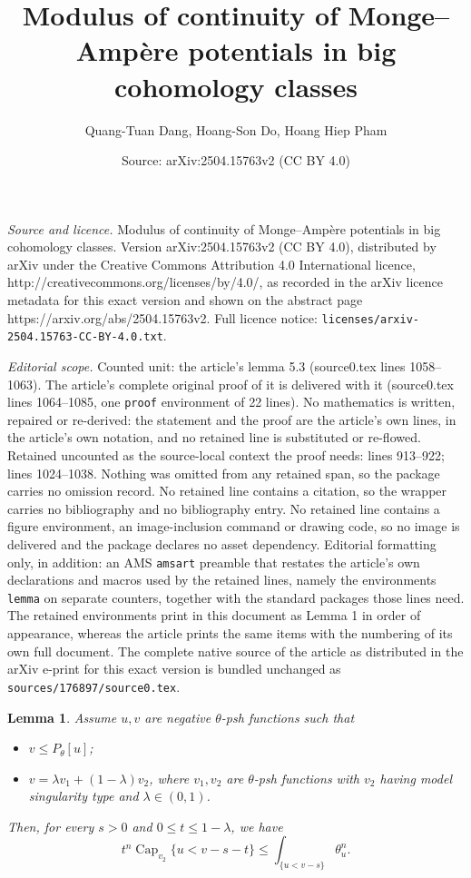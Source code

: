 \documentclass[10pt,a4paper]{amsart}
\title{Modulus of continuity of Monge--Amp\`ere potentials in big cohomology classes}
\author{Quang-Tuan Dang, Hoang-Son Do, Hoang Hiep Pham}
\date{Source: arXiv:2504.15763v2 (CC BY 4.0)}
\newtheorem{lemma}{Lemma}
\newcommand{\capacity}{\mathop{\mathrm{Cap}}\nolimits}
\begin{document}
\maketitle

\noindent\emph{Source and licence.} Modulus of continuity of Monge--Amp\`ere potentials in big cohomology classes. Version arXiv:2504.15763v2 (CC BY 4.0), distributed by arXiv under the Creative Commons Attribution 4.0 International licence, http://creativecommons.org/licenses/by/4.0/, as recorded in the arXiv licence metadata for this exact version and shown on the abstract page https://arxiv.org/abs/2504.15763v2. Full licence notice: \texttt{licenses/arxiv-2504.15763-CC-BY-4.0.txt}.\par\smallskip

\noindent\textit{Editorial scope.} Counted unit: the article's lemma 5.3 (source0.tex lines 1058--1063). The article's complete original proof of it is delivered with it (source0.tex lines 1064--1085, one \texttt{proof} environment of 22 lines). No mathematics is written, repaired or re-derived: the statement and the proof are the article's own lines, in the article's own notation, and no retained line is substituted or re-flowed.  Retained uncounted as the source-local context the proof needs: lines 913--922; lines 1024--1038.  Nothing was omitted from any retained span, so the package carries no omission record.  No retained line contains a citation, so the wrapper carries no bibliography and no bibliography entry.  No retained line contains a figure environment, an image-inclusion command or drawing code, so no image is delivered and the package declares no asset dependency.  Editorial formatting only, in addition: an AMS \texttt{amsart} preamble that restates the article's own declarations and macros used by the retained lines, namely the environments \texttt{lemma} on separate counters, together with the standard packages those lines need.  The retained environments print in this document as Lemma 1 in order of appearance, whereas the article prints the same items with the numbering of its own full document.  The complete native source of the article as distributed in the arXiv e-print for this exact version is bundled unchanged as \texttt{sources/176897/source0.tex}.
\begin{lemma}\label{lem t^n cap}
	Assume $u, v$ are negative $\theta$-psh functions such that
	\begin{itemize}
		\item $v\leq P_{\theta}[u]$;
		\item $v=\lambda v_1+(1-\lambda) v_2$, where  $v_1, v_2$ are $\theta$-psh functions
		with $v_2$ having model singularity type and $\lambda\in (0, 1)$. 
	\end{itemize}
Then, for every $s>0$ and $0\leq t\leq 1-\lambda$, we have
	$$t^n \capacity_{v_2}\{u<v-s- t\}\leq \int_{\{u<v-s\}}\theta_u^n.$$
\end{lemma}
\end{document}
